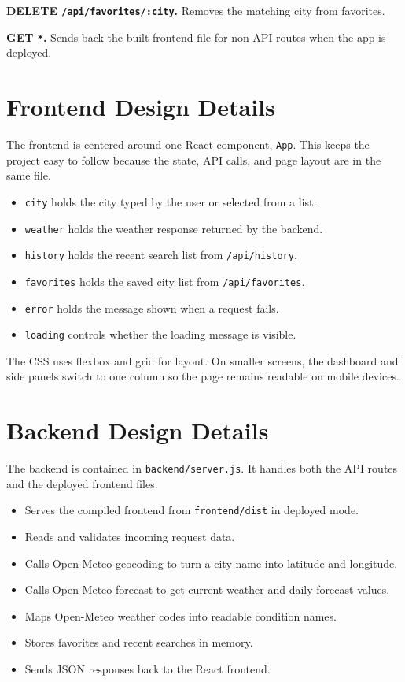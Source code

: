\documentclass[11pt]{article}
\begin{document}
\textbf{DELETE \texttt{/api/favorites/:city}.} Removes the matching city from favorites.

\textbf{GET \texttt{*}.} Sends back the built frontend file for non-API routes when the app is deployed.

\section{Frontend Design Details}
The frontend is centered around one React component, \texttt{App}. This keeps the project easy to follow because the state, API calls, and page layout are in the same file.

\begin{itemize}
\item \texttt{city} holds the city typed by the user or selected from a list.
\item \texttt{weather} holds the weather response returned by the backend.
\item \texttt{history} holds the recent search list from \texttt{/api/history}.
\item \texttt{favorites} holds the saved city list from \texttt{/api/favorites}.
\item \texttt{error} holds the message shown when a request fails.
\item \texttt{loading} controls whether the loading message is visible.
\end{itemize}

The CSS uses flexbox and grid for layout. On smaller screens, the dashboard and side panels switch to one column so the page remains readable on mobile devices.

\section{Backend Design Details}
The backend is contained in \texttt{backend/server.js}. It handles both the API routes and the deployed frontend files.

\begin{itemize}
\item Serves the compiled frontend from \texttt{frontend/dist} in deployed mode.
\item Reads and validates incoming request data.
\item Calls Open-Meteo geocoding to turn a city name into latitude and longitude.
\item Calls Open-Meteo forecast to get current weather and daily forecast values.
\item Maps Open-Meteo weather codes into readable condition names.
\item Stores favorites and recent searches in memory.
\item Sends JSON responses back to the React frontend.
\end{itemize}
\end{document}
